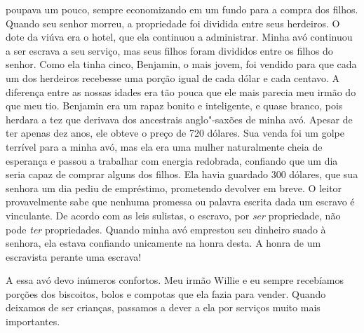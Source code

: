 poupava um pouco, sempre economizando em um fundo para a compra dos
filhos. Quando seu senhor morreu, a propriedade foi dividida entre seus
herdeiros. O dote da viúva era o hotel, que ela continuou a administrar.
Minha avó continuou a ser escrava a seu serviço, mas seus filhos foram
divididos entre os filhos do senhor. Como ela tinha cinco, Benjamin, o
mais jovem, foi vendido para que cada um dos herdeiros recebesse uma
porção igual de cada dólar e cada centavo. A diferença entre as nossas
idades era tão pouca que ele mais parecia meu irmão do que meu tio.
Benjamin era um rapaz bonito e inteligente, e quase branco, pois herdara
a tez que derivava dos ancestrais anglo"-saxões de minha avó. Apesar de
ter apenas dez anos, ele obteve o preço de 720 dólares. Sua venda foi um
golpe terrível para a minha avó, mas ela era uma mulher naturalmente
cheia de esperança e passou a trabalhar com energia redobrada, confiando
que um dia seria capaz de comprar alguns dos filhos. Ela havia guardado
300 dólares, que sua senhora um dia pediu de empréstimo, prometendo
devolver em breve. O leitor provavelmente sabe que nenhuma promessa ou
palavra escrita dada um escravo é vinculante. De acordo com as leis
sulistas, o escravo, por \emph{ser} propriedade, não pode \emph{ter}
propriedades. Quando minha avó emprestou seu dinheiro suado à senhora,
ela estava confiando unicamente na honra desta. A honra de um escravista
perante uma escrava!

A essa avó devo inúmeros confortos. Meu
irmão Willie e eu sempre recebíamos porções dos biscoitos, bolos e
compotas que ela fazia para vender. Quando deixamos de ser crianças,
passamos a dever a ela por serviços muito mais importantes.

